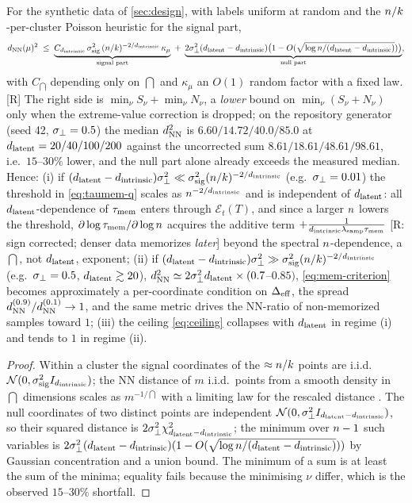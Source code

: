 \begin{corollary}\label{cor:dnn-scaling}
For the synthetic data of \cref{sec:design}, with labels uniform at random and the $n/k$-per-cluster Poisson heuristic for the signal part,
\begin{equation}\label{eq:dnn-scaling}
 d_{\rm NN}(\mu)^2\;\le\;\underbrace{C_{d_{\mathrm{intrinsic}}}\,\sigma_{\mathrm{sig}}^2\,(n/k)^{-2/d_{\mathrm{intrinsic}}}\,\kappa_\mu}_{\text{signal part}}\;+\;\underbrace{2\sigma_{\perp}^2(d_{\mathrm{latent}}-d_{\mathrm{intrinsic}})\big(1-O(\sqrt{\log n/(d_{\mathrm{latent}}-d_{\mathrm{intrinsic}})})\big)}_{\text{null part}},
\end{equation}
with $C_{\dint}$ depending only on $\dint$ and $\kappa_\mu$ an $O(1)$ random factor with a fixed law. [R] The right side is $\min_\nu S_\nu+\min_\nu N_\nu$, a \emph{lower} bound on $\min_\nu(S_\nu+N_\nu)$ only when the extreme-value correction is dropped; on the repository generator (seed 42, $\sigma_{\perp}=0.5$) the median $d_{\rm NN}^2$ is $6.60/14.72/40.0/85.0$ at $d_{\mathrm{latent}}=20/40/100/200$ against the uncorrected sum $8.61/18.61/48.61/98.61$, i.e.\ $15$--$30\%$ lower, and the null part alone already exceeds the measured median. Hence: (i) if $(d_{\mathrm{latent}}-d_{\mathrm{intrinsic}})\sigma_{\perp}^2\ll\sigma_{\mathrm{sig}}^2(n/k)^{-2/d_{\mathrm{intrinsic}}}$ (e.g.\ $\sigma_{\perp}=0.01$) the threshold in \eqref{eq:taumem-q} scales as $n^{-2/d_{\mathrm{intrinsic}}}$ and is independent of $d_{\mathrm{latent}}$: all $d_{\mathrm{latent}}$-dependence of $\tau_{\mathrm{mem}}$ enters through $\mathcal E_t(T)$, and since a larger $n$ lowers the threshold, $\partial\log\tau_{\mathrm{mem}}/\partial\log n$ acquires the additive term $+\frac{1}{d_{\mathrm{intrinsic}}\lambda_{\rm samp}\tau_{\mathrm{mem}}}$ [R: sign corrected; denser data memorizes \emph{later}] beyond the spectral $n$-dependence, a $\dint$, not $d_{\mathrm{latent}}$, exponent; (ii) if $(d_{\mathrm{latent}}-d_{\mathrm{intrinsic}})\sigma_{\perp}^2\gg\sigma_{\mathrm{sig}}^2(n/k)^{-2/d_{\mathrm{intrinsic}}}$ (e.g.\ $\sigma_{\perp}=0.5$, $d_{\mathrm{latent}}\gtrsim20$), $d_{\rm NN}^2\simeq2\sigma_{\perp}^2d_{\mathrm{latent}}\times(0.7$--$0.85)$, \eqref{eq:mem-criterion} becomes approximately a per-coordinate condition on $\Delta_{\rm eff}$, the spread $d^{(0.9)}_{\rm NN}/d^{(0.1)}_{\rm NN}\to1$, and the same metric drives the NN-ratio of non-memorized samples toward $1$; (iii) the ceiling \eqref{eq:ceiling} collapses with $d_{\mathrm{latent}}$ in regime (i) and tends to $1$ in regime (ii).
\end{corollary}
\begin{proof}
Within a cluster the signal coordinates of the $\approx n/k$ points are i.i.d.\ $\mathcal N(0,\sigma_{\mathrm{sig}}^2I_{d_{\mathrm{intrinsic}}})$; the NN distance of $m$ i.i.d.\ points from a smooth density in $\dint$ dimensions scales as $m^{-1/\dint}$ with a limiting law for the rescaled distance \citep{levina2004maximum,facco2017twonn}. The null coordinates of two distinct points are independent $\mathcal N(0,\sigma_{\perp}^2I_{d_{\mathrm{latent}}-d_{\mathrm{intrinsic}}})$, so their squared distance is $2\sigma_{\perp}^2\chi^2_{d_{\mathrm{latent}}-d_{\mathrm{intrinsic}}}$; the minimum over $n-1$ such variables is $2\sigma_{\perp}^2(d_{\mathrm{latent}}-d_{\mathrm{intrinsic}})(1-O(\sqrt{\log n/(d_{\mathrm{latent}}-d_{\mathrm{intrinsic}})}))$ by Gaussian concentration and a union bound. The minimum of a sum is at least the sum of the minima; equality fails because the minimising $\nu$ differ, which is the observed $15$--$30\%$ shortfall.
\end{proof}

